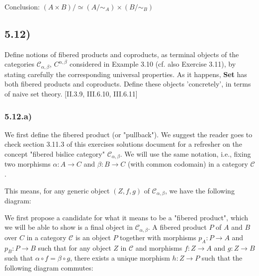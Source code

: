 Conclusion: $(A \times B)/ \simeq (A / \sim_A) \times (B / \sim_B)$



\subsection*{5.12)}

Define notions of fibered products and coproducts, as terminal objects of the categories $\mathcal{C}_{\alpha,\beta}$, $C^{\alpha,\beta}$ considered in Example 3.10 (cf. also Exercise 3.11), by stating carefully the corresponding universal properties.
As it happens, \textbf{Set} has both fibered products and coproducts. Define these objects 'concretely', in terms of naive set theory. [II.3.9, III.6.10, III.6.11]


\subsubsection*{5.12.a)}

We first define the fibered product (or "pullback"). We suggest the reader goes to check section 3.11.3 of this exercises solutions document for a refresher on the concept "fibered bislice category" $\mathcal{C}_{\alpha,\beta}$. We will use the same notation, i.e., fixing two morphisms $\alpha : A \to C$ and $\beta : B \to C$ (with common codomain) in a category $\mathcal{C}$.

This means, for any generic object $(Z, f, g)$ of $\mathcal{C}_{\alpha,\beta}$, we have the following diagram:


We first propose a candidate for what it means to be a "fibered product", which we will be able to show is a final object in $\mathcal{C}_{\alpha,\beta}$. A fibered product $P$ of $A$ and $B$ over $C$ in a category $\mathcal{C}$ is an object $P$ together with morphisms $p_A : P \to A$ and $p_B : P \to B$ such that for any object $Z$ in $\mathcal{C}$ and morphisms $f : Z \to A$ and $g : Z \to B$ such that $\alpha \circ f = \beta \circ g$, there exists a unique morphism $h : Z \to P$ such that the following diagram commutes:

